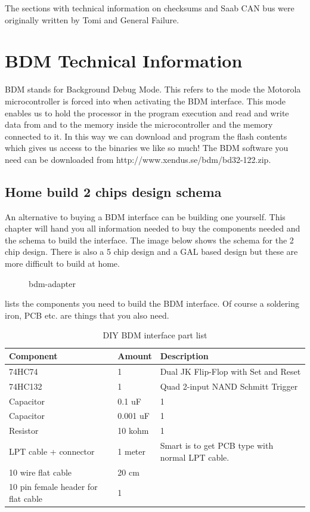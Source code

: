\documentclass[11pt,a4paper]{book}
\newcommand{\Mfig}[1]{%
\begin{figure}
    \centering
    \missingfigure{#1}
    \caption{#1}
\end{figure}}
\begin{document}
The sections with technical information on checksums and Saab CAN bus were originally
written by Tomi and General Failure.



\appendix
\chapter{BDM Technical Information}
BDM stands for Background Debug Mode. This refers to the mode the Motorola microcontroller is
forced into when activating the BDM interface. This mode enables us to hold the processor in the
program execution and read and write data from and to the memory inside the microcontroller and
the memory connected to it. In this way we can download and program the flash contents which gives
us access to the binaries we like so much! The BDM software you need can be downloaded from
http://www.xendus.se/bdm/bd32-122.zip.

\section{Home build 2 chips design schema}
An alternative to buying a BDM interface can be building one yourself. This chapter will hand you all
information needed to buy the components needed and the schema to build the interface. The image
below shows the schema for the 2 chip design. There is also a 5 chip design and a GAL based design
but these are more difficult to build at home.

\Mfig{bdm-adapter}

 lists the components you need to build the BDM interface. Of course a soldering
iron, PCB etc. are things that you also need.

\begin{table}
    \centering
    \begin{tabular}{lll}
        Component & Amount & Description \\
        \midrule
        74HC74 & 1 & Dual JK Flip-Flop with Set and Reset \\
        74HC132 & 1&  Quad 2-input NAND Schmitt Trigger \\
        Capacitor &0.1 uF& 1 \\
        Capacitor &0.001 uF& 1 \\
        Resistor &10 kohm & 1 \\
        LPT cable + connector &1 meter& Smart is to get PCB type with normal LPT cable.
        \\
        10 wire flat cable &20 cm  & \\
        10 pin female header for flat cable & 1
    \end{tabular}
    \caption{DIY BDM interface part list}
    \label{tab:bdm-part-list}
\end{table}
\end{document}
